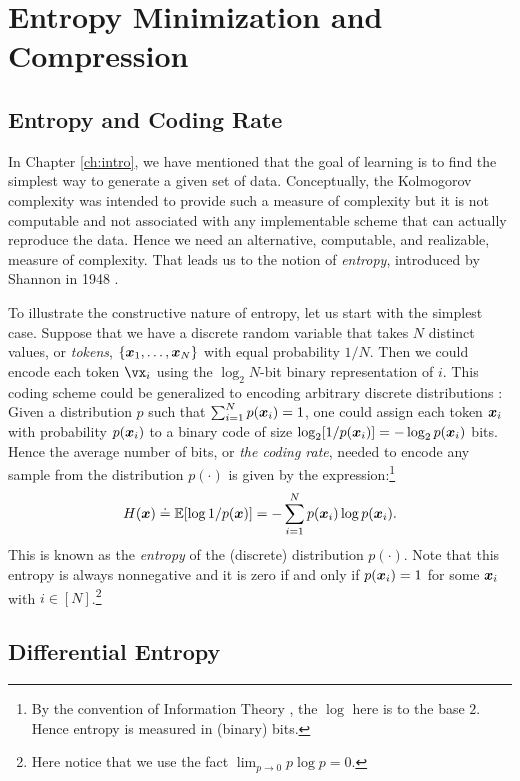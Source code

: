 \documentclass[../../book-main.tex]{subfiles}
\begin{document}
\section{Entropy Minimization and Compression}

\subsection{Entropy and Coding Rate}
In Chapter \ref{ch:intro}, we have mentioned that the goal of  learning is to find the simplest way to generate a given set of data. Conceptually, the Kolmogorov complexity was intended to provide such a measure of complexity but it is not computable and not associated with any implementable scheme that can actually reproduce the data. Hence we need an alternative, computable, and realizable, measure of complexity. That leads us to the notion of {\em entropy}, introduced by Shannon in 1948 \cite{Shannon-1948}.

To illustrate the constructive nature of entropy, let us start with the simplest case. Suppose that we have a discrete random variable that takes $N$ distinct values, or \textit{tokens}, $\{\bm{x}_1, \ldots, \bm{x}_N\}$ with equal probability $1/N$. Then we could encode each token \(\vx_{i}\) using the \(\log_2 N\)-bit binary representation of \(i\). This coding scheme could be generalized to encoding arbitrary discrete distributions \cite{Cover-Thomas}: Given a distribution \(p\) such that $\sum_{i=1}^N p(\bm{x}_i) = 1$, one could assign each token $\bm{x}_i$ with probability $p(\bm{x}_i)$ to a binary code of size $\log_2 [1/p(\bm{x}_i)] = - \log_2 p(\bm{x}_i)$ bits. Hence the average number of bits, or {\em the coding rate}, needed to encode any sample from the distribution $p(\cdot)$ is given by the expression:\footnote{By the convention of  Information Theory \cite{Cover-Thomas}, the $\log$ here is to the base $2$. Hence entropy is measured in (binary) bits.}
\begin{equation}
	H(\bm{x}) \doteq \mathbb{E}[\log 1/p(\bm{x})]  = - \sum_{i=1}^N p(\bm{x}_i) \log  p(\bm{x}_i).
	\label{eqn:entropy-discrete}
\end{equation}
This is known as the {\em entropy} of the (discrete) distribution $p(\cdot)$. Note that this entropy is always nonnegative and it is zero if and only if $p(\bm{x}_i) = 1$ for some $\bm{x}_i$ with $i \in [N]$.\footnote{Here notice that we use the fact $\lim_{p\rightarrow 0} p \log p = 0$.}


\subsection{Differential Entropy}
\end{document}
